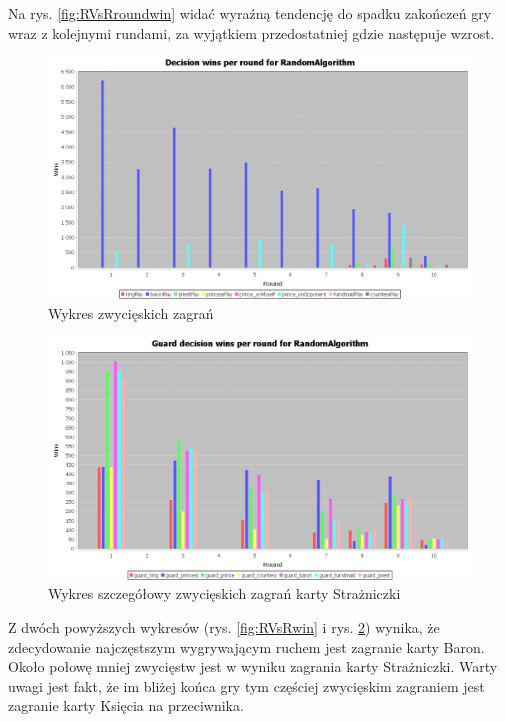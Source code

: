 Na rys. \ref{fig:RVsRroundwin} widać wyraźną tendencję do spadku zakończeń gry wraz z kolejnymi rundami, za wyjątkiem przedostatniej gdzie następuje wzrost.

\clearpage
\begin{figure}[H]
	\centering
	\includegraphics[width=\textwidth]{Resources/RVsR/RVsRdecision.PNG}
	\caption{Wykres zwycięskich zagrań} 
	\label{fig:RVsRdecision}
\end{figure} 

\begin{figure}[H]
	\centering
	\includegraphics[width=\textwidth]{Resources/RVsR/RVsRguarddecision.PNG}
	\caption{Wykres szczegółowy zwycięskich zagrań karty Strażniczki} 
	\label{fig:RVsRguarddecision}
\end{figure}

Z dwóch powyższych wykresów (rys. \ref{fig:RVsRwin} i rys. \ref{fig:RVsRguarddecision}) wynika, że zdecydowanie najczęstszym wygrywającym ruchem jest zagranie karty Baron. Około połowę mniej zwycięstw jest w wyniku zagrania karty Strażniczki. Warty uwagi jest fakt, że im bliżej końca gry tym częściej zwycięskim zagraniem jest zagranie karty Księcia na przeciwnika.

